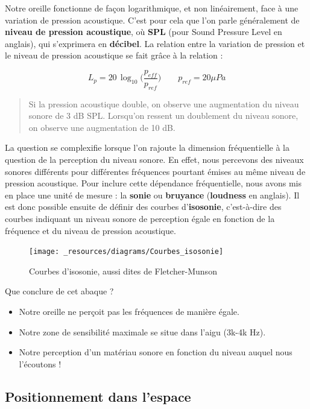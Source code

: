 \documentclass[
]{book}
\providecommand{\tightlist}{%
  \setlength{\itemsep}{0pt}\setlength{\parskip}{0pt}}
\begin{document}
Notre oreille fonctionne de façon logarithmique, et non linéairement, face à une variation de pression acoustique. C'est pour cela que l'on parle généralement de \textbf{niveau de pression acoustique}, où \textbf{SPL} (pour Sound Pressure Level en anglais), qui s'exprimera en \textbf{décibel}. La relation entre la variation de pression et le niveau de pression acoustique se fait grâce à la relation :

\[L_p = 20\,\log_{10}\Big(\frac{p_{eff}}{p_{ref}}\Big) \qquad p_{ref} = 20\mu Pa\]

\begin{quote}
Si la pression acoustique double, on observe une augmentation du niveau sonore de 3 dB SPL. Lorsqu'on ressent un doublement du niveau sonore, on observe une augmentation de 10 dB.
\end{quote}

La question se complexifie lorsque l'on rajoute la dimension fréquentielle à la question de la perception du niveau sonore. En effet, nous percevons des niveaux sonores différents pour différentes fréquences pourtant émises au même niveau de pression acoustique. Pour inclure cette dépendance fréquentielle, nous avons mis en place une unité de mesure : la \textbf{sonie} ou \textbf{bruyance} (\textbf{loudness} en anglais). Il est donc possible ensuite de définir des courbes d'\textbf{isosonie}, c'est-à-dire des courbes indiquant un niveau sonore de perception égale en fonction de la fréquence et du niveau de pression acoustique.

\begin{figure}

{\centering \texttt{[image: \_resources/diagrams/Courbes\_isosonie]} 

}

\caption{Courbes d'isosonie, aussi dites de Fletcher-Munson}\label{fig:unnamed-chunk-8}
\end{figure}

Que conclure de cet abaque ?

\begin{itemize}
\tightlist
\item
  Notre oreille ne perçoit pas les fréquences de manière égale.
\item
  Notre zone de sensibilité maximale se situe dans l'aigu (3k-4k Hz).
\item
  Notre perception d'un matériau sonore en fonction du niveau auquel nous l'écoutons !
\end{itemize}

\hypertarget{positionnement-dans-lespace}{%
\subsection{Positionnement dans l'espace}\label{positionnement-dans-lespace}}
\end{document}
